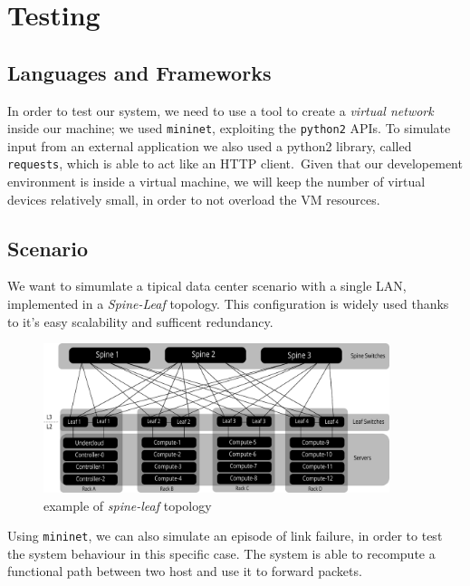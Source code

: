 \chapter{Testing}
\section*{Languages and Frameworks}
In order to test our system, we need to use a tool to create a \textit{virtual network} inside our machine; we used \texttt{mininet}, 
exploiting the \texttt{python2} APIs. To simulate input from an external application we also used a python2 library, called \texttt{requests},
which is able to act like an HTTP client.\
Given that our developement environment is inside a virtual machine, we will keep the number of virtual devices relatively small, in order to not
overload the VM resources.

\section*{Scenario}
We want to simumlate a tipical data center scenario with a single LAN, implemented in a \textit{Spine-Leaf} topology. This configuration
is widely used thanks to it's easy scalability and sufficent redundancy.
\begin{figure}[h]
    \centering
    \caption{example of \textit{spine-leaf} topology}
    \includegraphics[width=0.90\textwidth]{img/spine_leaf.pdf}
\end{figure}

Using \texttt{mininet}, we can also simulate an episode of link failure, in order to test the system behaviour in this specific case. The system is able to
recompute a functional path between two host and use it to forward packets.

